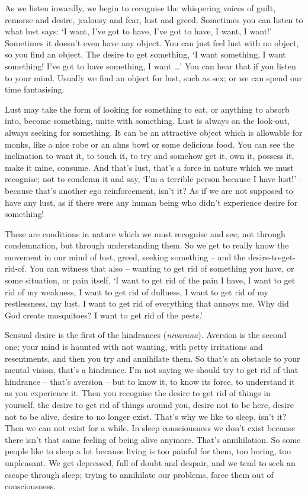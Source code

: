 
As we listen inwardly, we begin to recognise the whispering voices of guilt, remorse and desire, jealousy and fear, lust and greed. Sometimes you can listen to what lust says: `I want, I've got to have, I've got to have, I want, I want!' Sometimes it doesn't even have any object. You can just feel lust with no object, so you find an object. The desire to get something, `I want something, I want something! I've got to have something, I want \ldots{}' You can hear that if you listen to your mind. Usually we find an object for lust, such as sex; or we can spend our time fantasising.

Lust may take the form of looking for something to eat, or anything to absorb into, become something, unite with something. Lust is always on the look-out, always seeking for something. It can be an attractive object which is allowable for monks, like a nice robe or an alms bowl or some delicious food. You can see the inclination to want it, to touch it, to try and somehow get it, own it, possess it, make it mine, consume. And that's lust, that's a force in nature which we must recognise; not to condemn it and say, `I'm a terrible person because I have lust!' -- because that's another ego reinforcement, isn't it? As if we are not supposed to have any lust, as if there were any human being who didn't experience desire for something!

These are conditions in nature which we must recognise and see; not through condemnation, but through understanding them. So we get to really know the movement in our mind of lust, greed, seeking something -- and the desire-to-get-rid-of. You can witness that also -- wanting to get rid of something you have, or some situation, or pain itself. `I want to get rid of the pain I have, I want to get rid of my weakness, I want to get rid of dullness, I want to get rid of my restlessness, my lust. I want to get rid of everything that annoys me. Why did God create mosquitoes? I want to get rid of the pests.' 

Sensual desire is the first of the hindrances (\textit{nivarana}). Aversion is the second one; your mind is haunted with not wanting, with petty irritations and resentments, and then you try and annihilate them. So that's an obstacle to your mental vision, that's a hindrance. I'm not saying we should try to get rid of that hindrance -- that's aversion -- but to know it, to know its force, to understand it as you experience it. Then you recognise the desire to get rid of things in yourself, the desire to get rid of things around you, desire not to be here, desire not to be alive, desire to no longer exist. That's why we like to sleep, isn't it? Then we can not exist for a while. In sleep consciousness we don't exist because there isn't that same feeling of being alive anymore. That's annihilation. So some people like to sleep a lot because living is too painful for them, too boring, too unpleasant. We get depressed, full of doubt and despair, and we tend to seek an escape through sleep; trying to annihilate our problems, force them out of consciousness.

